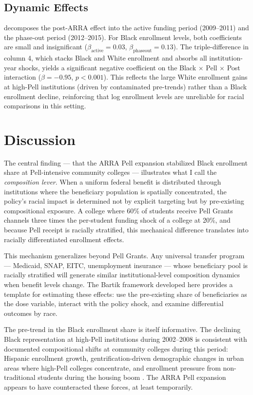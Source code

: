 \documentclass[12pt]{article}
\begin{document}
\subsection{Dynamic Effects}



 decomposes the post-ARRA effect into the active funding period (2009--2011) and the phase-out period (2012--2015). For Black enrollment levels, both coefficients are small and insignificant ($\beta_{\text{active}} = 0.03$, $\beta_{\text{phaseout}} = 0.13$). The triple-difference in column 4, which stacks Black and White enrollment and absorbs all institution-year shocks, yields a significant negative coefficient on the Black $\times$ Pell $\times$ Post interaction ($\beta = -0.95$, $p < 0.001$). This reflects the large White enrollment gains at high-Pell institutions (driven by contaminated pre-trends) rather than a Black enrollment decline, reinforcing that log enrollment levels are unreliable for racial comparisons in this setting.

\section{Discussion}

The central finding --- that the ARRA Pell expansion stabilized Black enrollment share at Pell-intensive community colleges --- illustrates what I call the \textit{composition lever}. When a uniform federal benefit is distributed through institutions where the beneficiary population is spatially concentrated, the policy's racial impact is determined not by explicit targeting but by pre-existing compositional exposure. A college where 60\% of students receive Pell Grants channels three times the per-student funding shock of a college at 20\%, and because Pell receipt is racially stratified, this mechanical difference translates into racially differentiated enrollment effects.

This mechanism generalizes beyond Pell Grants. Any universal transfer program --- Medicaid, SNAP, EITC, unemployment insurance --- whose beneficiary pool is racially stratified will generate similar institutional-level composition dynamics when benefit levels change. The Bartik framework developed here provides a template for estimating these effects: use the pre-existing share of beneficiaries as the dose variable, interact with the policy shock, and examine differential outcomes by race.

The pre-trend in the Black enrollment share is itself informative. The declining Black representation at high-Pell institutions during 2002--2008 is consistent with documented compositional shifts at community colleges during this period: Hispanic enrollment growth, gentrification-driven demographic changes in urban areas where high-Pell colleges concentrate, and enrollment pressure from non-traditional students during the housing boom \citep{bound2010have, looney2015earnings}. The ARRA Pell expansion appears to have counteracted these forces, at least temporarily.
\end{document}

